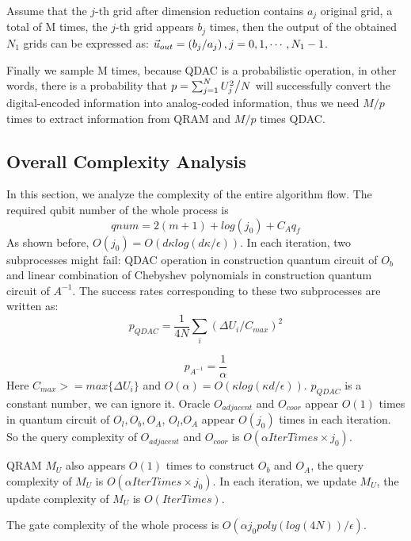 \documentclass[%
 reprint,
 amsmath,amssymb,
pra,
]{revtex4-1}
\begin{document}
Assume that the $j$-th grid after dimension reduction contains $a_j$ original grid,
a total of M times, the $j$-th grid appears $b_j$ times, then the output of the obtained $N_1$ grids can be expressed as: ${\vec u_{out}} = \left( {{{{b_j}} \mathord{\left/
{\vphantom {{{b_j}} {{a_j}}}} \right. \kern-\nulldelimiterspace} {{a_j}}}} \right),j = 0,1, \cdots ,{N_1} - 1$.

Finally we sample M times,
because QDAC is a probabilistic operation,
in other words, 
there is a probability that $p = \sum\nolimits_{j = 1}^N {{{U_j^2} \mathord{\left/
{\vphantom {{U_j^2} N}} \right. \kern-\nulldelimiterspace} N}} $ will successfully convert 
the digital-encoded information into analog-coded information,
thus we need $M/p$ times to extract information from QRAM and $M/p$ times QDAC.



\subsection{Overall Complexity Analysis}

In this section, we analyze the complexity of the entire algorithm flow. The required qubit number of the whole process is 
$$
qnum=2(m+1)+log(j_0)+C_Aq_f
$$
As shown before, $O(j_0)=O(d\kappa log(d\kappa/\epsilon))$.
In each iteration, two subprocesses might fail: QDAC operation in construction quantum circuit of $O_b$ and linear combination of Chebyshev polynomials in construction quantum circuit of $A^{-1}$. The success rates corresponding to these two subprocesses are written as:
$$
p_{QDAC}=\frac{1}{4N}\sum_i{(\Delta U_i/C_{max})^2}
$$

$$
p_{A^{-1}}=\frac{1}{\alpha}
$$
Here $C_{max}>=max\{\Delta U_i\}$ and $O(\alpha)=O(\kappa log(\kappa d/\epsilon))$. $p_{QDAC}$ is a constant number, we can ignore it.
Oracle $O_{adjacent}$ and $O_{coor}$ appear $O(1)$ times in quantum circuit of $O_l,O_b,O_A$, $O_l$,$O_A$ appear $O(j_0)$ times in each iteration. So the query complexity of $O_{adjacent}$ and $O_{coor}$ is $O(\alpha IterTimes\times j_0)$.

QRAM $M_U$ also appears $O(1)$ times to construct $O_b$ and $O_A$, the query complexity of $M_U$ is $O(\alpha IterTimes\times j_0)$. In each iteration, we update $M_U$, the update complexity of $M_U$ is $O(IterTimes)$.

The gate complexity of the whole process is $O(\alpha j_0poly(log(4N))/\epsilon)$.
\end{document}
